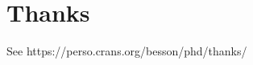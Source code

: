 \chapter{Thanks}

See https://perso.crans.org/besson/phd/thanks/


\Blindtext

\blindmathpaper

\Blindtext

\blindmathpaper



